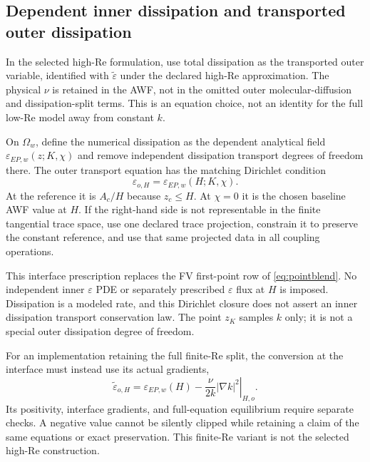 \documentclass[11pt,a4paper]{article}
\numberwithin{equation}{section}
\newcommand{\eps}{\varepsilon}
\newcommand{\et}{\widetilde{\varepsilon}}
\newcommand{\Aref}{A_c}
\newcommand{\EEP}{\eps_{EP,w}}
\begin{document}
\subsection{Dependent inner dissipation and transported outer dissipation}
\label{sec:hp-epsilon}
In the selected high-Re formulation, use total dissipation as the
transported outer variable, identified with $\et$ under the declared
high-Re approximation. The physical $\nu$ is retained in the AWF,
not in the omitted outer molecular-diffusion and dissipation-split
terms. This is an equation choice, not an identity for the full low-Re
model away from constant $k$.

On $\Omega_w$, define the numerical dissipation as the dependent
analytical field $\EEP(z;K,\chi)$ and remove independent dissipation
transport degrees of freedom there. The outer transport equation has
the matching Dirichlet condition
\begin{equation}
 \boxed{\eps_{o,H}=\EEP(H;K,\chi).}
 \label{eq:hp-epsilon-trace}
\end{equation}
At the reference it is $\Aref/H$ because $z_c\leq H$. At $\chi=0$
it is the chosen baseline AWF value at $H$. If the right-hand side
is not representable in the finite tangential trace space, use one
declared trace projection, constrain it to preserve the constant
reference, and use that same projected data in all coupling operations.

This interface prescription replaces the FV first-point row of
\cref{eq:pointblend}. No independent inner $\eps$ PDE or separately
prescribed $\eps$ flux at $H$ is imposed. Dissipation is a modeled
rate, and this Dirichlet closure does not assert an inner dissipation
transport conservation law. The point $z_K$ samples $k$ only; it is
not a special outer dissipation degree of freedom.

For an implementation retaining the full finite-Re split, the
conversion at the interface must instead use its actual gradients,
\begin{equation}
 \et_{o,H}=\EEP(H)-\left.\frac{\nu}{2k}|\nabla k|^2\right|_{H,o}.
 \label{eq:hp-epsilon-split}
\end{equation}
Its positivity, interface gradients, and full-equation equilibrium
require separate checks. A negative value cannot be silently clipped
while retaining a claim of the same equations or exact preservation.
This finite-Re variant is not the selected high-Re construction.
\end{document}

